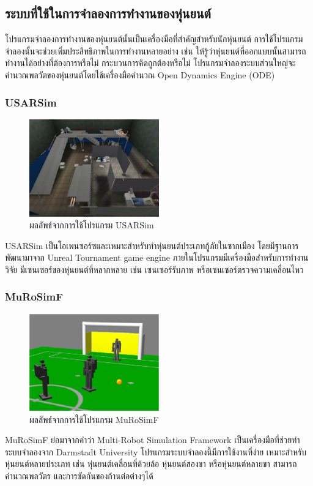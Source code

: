 \clearpage
\subsection{ระบบที่ใช้ในการจำลองการทำงานของหุ่นยนต์}
โปรแกรมจำลองการทำงานของหุ่นยนต์นั้นเป็นเครื่องมือที่สำคัญสำหรับนักหุ่นยนต์ การใช้โปรแกรมจำลองนั้นจะช่วยเพิ่มประสิทธิภาพในการทำงานหลายอย่าง
เช่น ให้รู้ว่าหุ่นยนต์ที่ออกแบบนั้นสามารถทำงานได้อย่างที่ต้องการหรือไม่ กระบวนการคิดถูกต้องหรือไม่
โปรแกรมจำลองระบบส่วนใหญ่จะคำนวณพลวัตของหุ่นยนต์โดยใช้เครื่องมือคำนวณ Open Dynamics Engine (ODE)

\subsubsection*{USARSim}
\begin{figure}[!ht]
	\centering
	\includegraphics[width=0.5\textwidth]{chapter2/images/sim_USARSim.jpg}
    \caption{ผลลัพธ์จากการใช้โปรแกรม USARSim}
    \label{fig:sim_USARSim}
\end{figure}
USARSim เป็นโอเพนซอร์ซและเหมาะสำหรับทำหุ่นยนต์ประเภทกู้ภัยในซากเมือง โดยมีฐานการพัฒนามาจาก 
Unreal Tournament game engine ภายในโปรแกรมมีเครื่องมือสำหรับการทำงานวิจัย มีเซนเซอร์ของหุ่นยนต์ที่หลากหลาย 
เช่น เซนเซอร์รับภาพ หรือเซนเซอร์ตรวจความเคลื่อนไหว

\subsubsection*{MuRoSimF}
\begin{figure}[!ht]
    \centering
    \includegraphics[width=0.5\textwidth]{chapter2/images/sim_MuRoSimF.png}
    \caption{ผลลัพธ์จากการใช้โปรแกรม MuRoSimF}
    \label{fig:sim_MuRoSimF}
\end{figure}
MuRoSimF ย่อมาจากคำว่า Multi-Robot Simulation Framework เป็นเครื่องมือที่ช่วยทำระบบจำลองจาก
Darmstadt University โปรแกรมระบบจำลองนี้มีการใช้งานที่ง่าย เหมาะสำหรับหุ่นยนต์หลายประเภท เช่น
หุ่นยนต์เคลื่อนที่ด้วยล้อ หุ่นยนต์สองขา หรือหุ่นยนต์หลายขา สามารถคำนวณพลวัตร และการขัดกันของก้านต่อต่างๆได้

